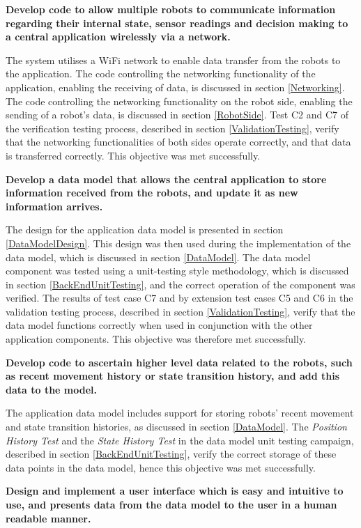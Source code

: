 \noindent \textbf{Develop code to allow multiple robots to communicate information regarding their internal state, sensor readings and decision making to a central application wirelessly via a network.}

The system utilises a WiFi network to enable data transfer from the robots to the application. The code controlling the networking functionality of the application, enabling the receiving of data, is discussed in section \ref{Networking}. The code controlling the networking functionality on the robot side, enabling the sending of a robot's data, is discussed in section \ref{RobotSide}. Test C2 and C7 of the verification testing process, described in section \ref{ValidationTesting}, verify that the networking functionalities of both sides operate correctly, and that data is transferred correctly. This objective was met successfully.

\noindent \textbf{Develop a data model that allows the central application to store information received from the robots, and update it as new information arrives.}

The design for the application data model is presented in section \ref{DataModelDesign}. This design was then used during the implementation of the data model, which is discussed in section \ref{DataModel}. The data model component was tested using a unit-testing style methodology, which is discussed in section \ref{BackEndUnitTesting}, and the correct operation of the component was verified. The results of test case C7 and by extension test cases C5 and C6 in the validation testing process, described in section \ref{ValidationTesting}, verify that the data model functions correctly when used in conjunction with the other application components. This objective was therefore met successfully.

\noindent \textbf{Develop code to ascertain higher level data related to the robots, such as recent movement history or state transition history, and add this data to the model.}

The application data model includes support for storing robots' recent movement and state transition histories, as discussed in section \ref{DataModel}. The \textit{Position History Test} and the \textit{State History Test} in the data model unit testing campaign, described in section \ref{BackEndUnitTesting}, verify the correct storage of these data points in the data model, hence this objective was met successfully.

\noindent \textbf{Design and implement a user interface which is easy and intuitive to use, and presents data from the data model to the user in a human readable manner.}

